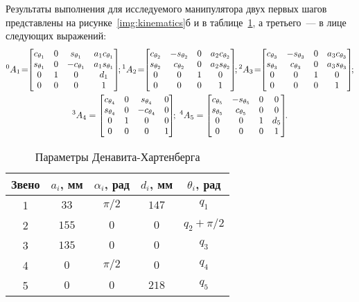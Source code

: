 Результаты выполнения для исследуемого манипулятора двух первых шагов представлены на рисунке~\ref{img:kinematics}б и в таблице~\ref{table_DH_params}, а третьего~--- в лице следующих выражений:
\begin{gather}
	{}^0A_1\! =\!\!
    \left[\begin{matrix}c_{\theta_1} & 0 & s_{\theta_1} & a_{1} c_{\theta_1}\\s_{\theta_1} & 0 & - c_{\theta_1} & a_{1} s_{\theta_1}\\0 & 1 & 0 & d_{1}\\0 & 0 & 0 & 1\end{matrix}\right]\!\!;
	{}^1A_2\! =\!\!
	\left[\begin{matrix}c_{\theta_2} & - s_{\theta_2} & 0 & a_{2} c_{\theta_2}\\s_{\theta_2} & c_{\theta_2} & 0 & a_{2} s_{\theta_2}\\0 & 0 & 1 & 0\\0 & 0 & 0 & 1\end{matrix}\right]\!\!;
	{}^2A_3\! =\!\!
	\left[\begin{matrix}c_{\theta_3} & - s_{\theta_3} & 0 & a_{3} c_{\theta_3}\\s_{\theta_3} & c_{\theta_3} & 0 & a_{3} s_{\theta_3}\\0 & 0 & 1 & 0\\0 & 0 & 0 & 1\end{matrix}\right]\!\!;\notag
	\\
	{}^3A_4 =
	 \left[\begin{matrix}c_{\theta_4} & 0 & s_{\theta_4} & 0\\s_{\theta_4} & 0 & - c_{\theta_4} & 0\\0 & 1 & 0 & 0\\0 & 0 & 0 & 1\end{matrix}\right]\!\!;
	\;
	{}^4A_5 =
	\left[\begin{matrix}c_{\theta_5} & - s_{\theta_5} & 0 & 0\\s_{\theta_5} & c_{\theta_5} & 0 & 0\\0 & 0 & 1 & d_{5}\\0 & 0 & 0 & 1\end{matrix}\right]\!\!\ldotp
\end{gather}

\begin{table}[h!]
	\caption{Параметры Денавита-Хартенберга}
	\begin{center}
		\begin{tabular}{|c|c|c|c|c|}
			\hline
			Звено 	& $a_i$, мм & $\alpha_i$, рад & $d_i$, мм & $\theta_i$, рад\\
			\hline
			1  		& $33$ & $\pi/2$ & $147$ & $q_1$\\
			\hline	
			2 		& $155$ & $0$ 	& $0$ 	& $q_2 + \pi/2$\\
			\hline
			3 		& $135$ & $0$ 	& $0$ 	& $q_3$\\
			\hline
			4 		& $0$ & $\pi/2$ & $0$ 	& $q_4$\\
			\hline
			5 		& $0$ & $0$ 	& $218$ & $q_5$\\
			\hline
		\end{tabular}
	\end{center}
	\label{table_DH_params}
\end{table}


